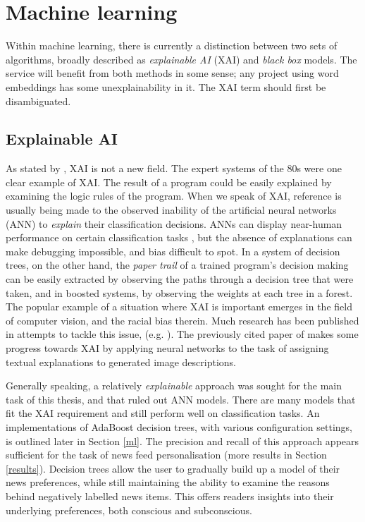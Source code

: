 \section{Machine learning\label{ml-bg}}

Within machine learning, there is currently a distinction between two sets of
algorithms, broadly described as {\it explainable AI} (XAI) and {\it black
box} models. The \nr{} service will benefit from both methods in
some sense; any project using word embeddings has some
unexplainability in it.  The XAI term should first be
disambiguated.

\subsection{Explainable AI} As stated by , XAI
is not a new field. The expert systems of the 80s were one
clear example of XAI. The result of a program could be easily
explained by examining the logic rules of the program.
When we speak of XAI, reference is usually being made to the observed
inability of the artificial neural networks (ANN)
to {\it explain} their classification decisions. ANNs can display near-human
performance on certain classification tasks \cite{krizhevsky2012}, but the
absence of explanations can make debugging impossible, and bias difficult to
spot. In a system of decision trees, on the other hand, the {\it paper trail}
of a trained program's decision making can be easily extracted by observing
the paths through a decision tree that were taken, and in boosted systems, by
observing the weights at each tree in a forest. The popular example of a situation
where XAI is important emerges in the field of computer vision, and the
racial bias therein. Much research has been published in attempts
to tackle this issue, (e.g. ). The previously cited paper
of \cite{goebel2018} makes some progress towards XAI by applying
neural networks to the task of assigning textual explanations
to generated image descriptions.

Generally speaking, a relatively {\it explainable} approach
was sought for the main task of this thesis, and that ruled
out ANN models. There are many models that fit the XAI
requirement and still perform well on classification tasks.
An implementations of AdaBoost decision trees, with various
configuration settings, is outlined later in Section \ref{ml}.
The precision and recall of this approach appears sufficient
for the task of news feed personalisation (more results in
Section \ref{results}).  Decision trees allow the user to
gradually build up a model of their news preferences, while
still maintaining the ability to examine the reasons behind
negatively labelled news items.  This offers readers insights
into their underlying preferences, both conscious and
subconscious.

